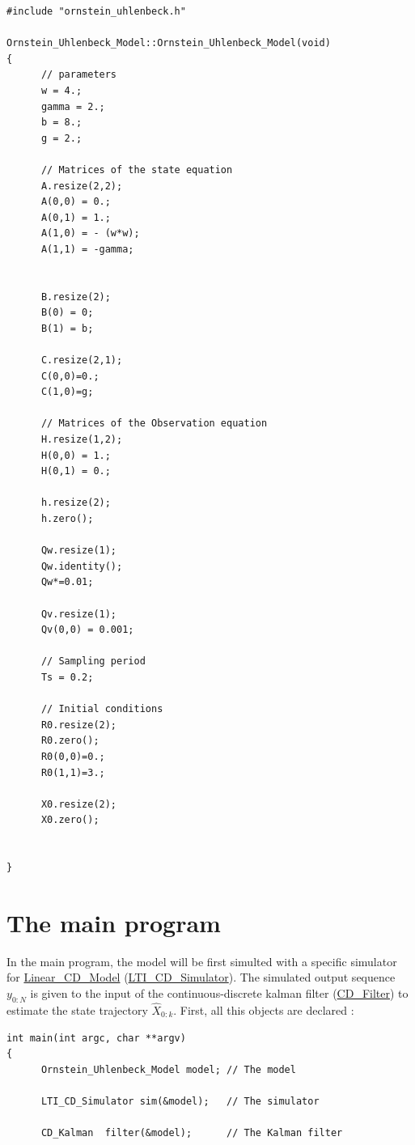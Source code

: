 \begin{DocInclude}\begin{verbatim}#include "ornstein_uhlenbeck.h"

Ornstein_Uhlenbeck_Model::Ornstein_Uhlenbeck_Model(void)
{
      // parameters
      w = 4.;
      gamma = 2.;
      b = 8.;
      g = 2.;

      // Matrices of the state equation
      A.resize(2,2);
      A(0,0) = 0.;
      A(0,1) = 1.;
      A(1,0) = - (w*w);
      A(1,1) = -gamma;
      
      
      B.resize(2);
      B(0) = 0;
      B(1) = b;

      C.resize(2,1);
      C(0,0)=0.;
      C(1,0)=g;

      // Matrices of the Observation equation
      H.resize(1,2);
      H(0,0) = 1.;
      H(0,1) = 0.;

      h.resize(2);
      h.zero();

      Qw.resize(1);
      Qw.identity();
      Qw*=0.01;

      Qv.resize(1);
      Qv(0,0) = 0.001;

      // Sampling period
      Ts = 0.2;

      // Initial conditions
      R0.resize(2);
      R0.zero();
      R0(0,0)=0.;
      R0(1,1)=3.;
      
      X0.resize(2);
      X0.zero();
            

}
\end{verbatim}
\end{DocInclude}
\hypertarget{page2_sec2}{}\section{The main program}\label{page2_sec2}
In the main program, the model will be first simulted with a specific simulator for \hyperlink{class_linear___c_d___model}{Linear\_\-CD\_\-Model} (\hyperlink{class_l_t_i___c_d___simulator}{LTI\_\-CD\_\-Simulator}). The simulated output sequence $ y_{0:N}$ is given to the input of the continuous-discrete kalman filter (\hyperlink{class_c_d___filter}{CD\_\-Filter}) to estimate the state trajectory $ \hat{X}_{0:k} $. First, all this objects are declared :

 

\begin{DocInclude}\begin{verbatim}int main(int argc, char **argv)
{
      Ornstein_Uhlenbeck_Model model; // The model

      LTI_CD_Simulator sim(&model);   // The simulator
      
      CD_Kalman  filter(&model);      // The Kalman filter      
\end{verbatim}
\end{DocInclude}



